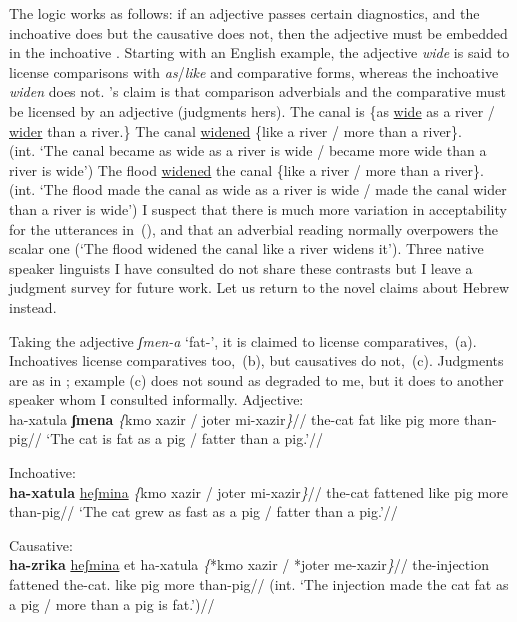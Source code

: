 The logic works as follows: if an adjective passes certain diagnostics, and the inchoative does but the causative does not, then the adjective must be embedded in the inchoative \citep[130]{borer91}. Starting with an English example, the adjective \emph{wide} is said to license comparisons with \emph{as}/\emph{like} and comparative forms, whereas the inchoative \emph{widen} does not. \citeauthor{borer91}'s claim is that comparison adverbials and the comparative must be licensed by an adjective (judgments hers).
\pex
  \a The canal is \{as \underline{wide} as a river / \underline{wider} than a river.\}
  \a The canal \underline{widened} \{like a river / more than a river\}.\\
	  (int. `The canal became as wide as a river is wide / became more wide than a river is wide')
  \a \ljudge{*} The flood \underline{widened} the canal \{like a river / more than a river\}.\\
	  (int. `The flood made the canal as wide as a river is wide / made the canal wider than a river is wide')
\xe
I suspect that there is much more variation in acceptability for the utterances in~(\lastx), and that an adverbial reading normally overpowers the scalar one (`The flood widened the canal like a river widens it'){. Three native speaker linguists I have consulted do not share these contrasts} but I leave a judgment survey for future work. Let us return to the novel claims about Hebrew instead.

Taking the adjective \emph{ʃmen-a} `fat-', it is claimed to license comparatives,~(\nextx a). Inchoatives license comparatives too,~(\nextx b), but causatives do not,~(\nextx c). Judgments are as in \cite{borer91}{; example} (\nextx c) {does not sound as degraded to me, but it does to another speaker whom I consulted informally.}
\pex
  \a Adjective:\\ \begingl
    \gla ha-xatula \textbf{ʃmena} \emph{\{}kmo xazir / joter mi-xazir\emph{\}}//
    \glb the-cat fat like pig {} more than-pig//
    \glft `The cat is fat as a pig / fatter than a pig.'//
  \endgl
  
  \a Inchoative:\\ \begingl
    \gla \textbf{ha-xatula} \underline{heʃmina} \emph{\{}kmo xazir / joter mi-xazir\emph{\}}//
    \glb the-cat fattened like pig {} more than-pig//
    \glft `The cat grew as fast as a pig / fatter than a pig.'//
  \endgl

  \a Causative:\\ \begingl
    \gla \ljudge{*}\textbf{ha-zrika} \underline{heʃmina} et ha-xatula \emph{\{}*kmo xazir / *joter me-xazir\emph{\}}//
    \glb the-injection fattened  the-cat. like pig {} more than-pig//
    \glft (int. `The injection made the cat fat as a pig / more than a pig is fat.')//
  \endgl
\xe

